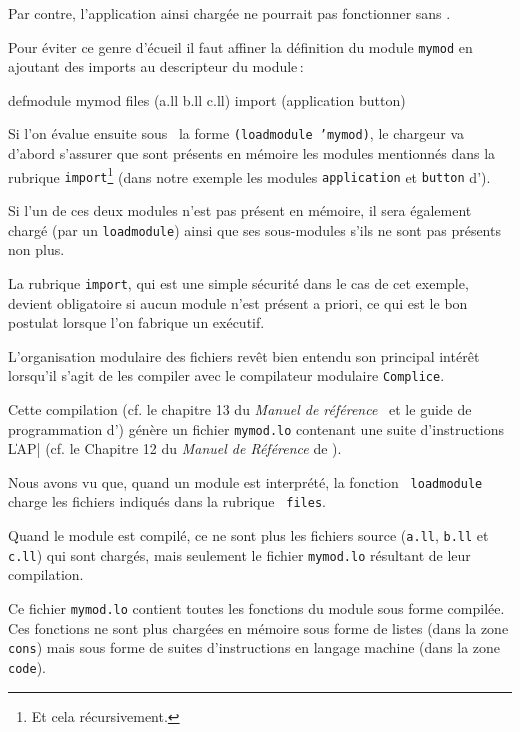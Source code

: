 Par contre, l'application ainsi charg\'{e}e
ne pourrait pas fonctionner sans \Aida.

Pour \'{e}viter ce genre d'\'{e}cueil il faut
affiner la d\'{e}finition du module {\tt mymod} en ajoutant des
imports au descripteur du module\,:

\begin{Code*}
defmodule mymod
files (a.ll b.ll c.ll)
import (application button)
\end{Code*}

Si l'on \'{e}value ensuite sous \Aida\ la forme
{\tt (loadmodule 'mymod)}, le
chargeur va d'abord s'assurer que sont pr\'{e}sents en m\'{e}moire les
modules mentionn\'{e}s dans la rubrique {\tt import}\footnote{Et cela
r\'{e}cursivement.} (dans notre exemple
les modules {\tt application} et {\tt button} d'\Aida).

Si l'un de ces deux modules n'est pas pr\'{e}sent en m\'{e}moire, il sera
\'{e}galement charg\'{e} (par un {\tt loadmodule}) ainsi que ses
sous-modules s'ils ne sont pas pr\'{e}sents non plus.

La rubrique {\tt import}, qui est une simple s\'{e}curit\'{e} dans le
cas de cet exemple, devient obligatoire si aucun module
n'est pr\'{e}sent a priori, ce qui est le bon postulat lorsque l'on
fabrique un ex\'{e}cutif.




L'organisation modulaire des fichiers rev\^{e}t bien entendu
son principal int\'{e}r\^{e}t 
lorsqu'il s'agit de les compiler avec le 
compilateur modulaire {\tt Complice}.

Cette compilation 
(cf. le chapitre 13 du {\em Manuel de r\'{e}f\'{e}rence} \LeLisp\  et le guide de
programmation d'\Aida) g\'{e}n\`{e}re un fichier {\tt mymod.lo} contenant
une suite d'instructions \|LAP| (cf. le Chapitre 12 du {\em Manuel
de R\'{e}f\'{e}rence} de \LeLisp).

Nous avons vu que, quand un module est interpr\'{e}t\'{e}, la fonction {\tt
loadmodule} charge les fichiers indiqu\'{e}s dans la rubrique {\tt
files}.

Quand le module est compil\'{e}, ce ne sont plus les fichiers source
({\tt a.ll}, {\tt b.ll} et {\tt c.ll}) qui sont charg\'{e}s, mais
seulement le fichier {\tt mymod.lo} r\'{e}sultant de leur compilation.

Ce fichier {\tt mymod.lo} contient toutes les fonctions du module
sous forme compil\'{e}e. Ces fonctions ne sont plus charg\'{e}es en m\'{e}moire
sous forme de listes (dans la zone {\tt cons}) mais sous forme de
suites d'instructions en langage machine (dans la zone {\tt code}).

